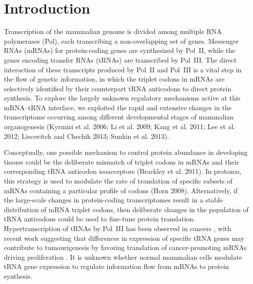 \chapter{Introduction}


Transcription of the mammalian genome is divided among multiple RNA polymerases
(Pol), each transcribing a non-overlapping set of genes. Messenger RNAs (mRNAs)
for protein-coding genes are synthesized by Pol~II, while the genes encoding
transfer RNAs (tRNAs) are transcribed by Pol~III. The direct interaction of
these transcripts produced by Pol~II and Pol~III is a vital step in the flow of
genetic information, in which the triplet codons in mRNAs are selectively
identified by their counterpart tRNA anticodons to direct protein synthesis. To
explore the largely unknown regulatory mechanisms active at this mRNA–tRNA
interface, we exploited the rapid and extensive changes in the transcriptome
occurring among different developmental stages of mammalian organogenesis
(Kyrmizi et al. 2006; Li et al. 2009; Kang et al. 2011; Lee et al. 2012;
Liscovitch and Chechik 2013; Sunkin et al. 2013).

Conceptually, one possible mechanism to control protein abundance in developing
tissues could be the deliberate mismatch of triplet codons in mRNAs and their
corresponding tRNA anticodon isoacceptors (Bra\-ck\-ley et al. 2011). In protozoa,
this strategy is used to modulate the rate of translation of specific subsets of
mRNAs containing a particular profile of codons (Horn 2008). Alternatively, if
the large-scale changes in protein-coding transcriptomes result in a stable
distribution of mRNA triplet codons, then deliberate changes in the population
of tRNA anticodons could be used to fine-tune protein translation.
Hypertranscription of tRNAs by Pol~III has been observed in cancers
\citep{Winter:2000, Pavon-Eternod:2009, Pavon-Eternod:2013}, with recent work
suggesting that differences in expression of specific tRNA genes may contribute
to tumourigenesis by favoring translation of cancer-promoting mRNAs driving
proliferation \citep{Pavon-Eternod:2009}. It is unknown whether normal
mammalian cells modulate tRNA gene expression to regulate information flow from
mRNAs to protein synthesis.
